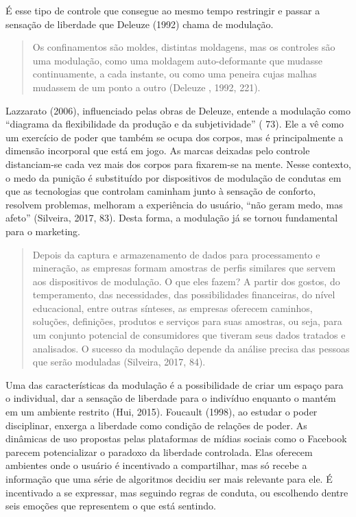 É esse tipo de controle que consegue ao mesmo tempo restringir e passar
a sensação de liberdade que Deleuze (1992) chama de modulação.

\begin{quote}
Os confinamentos são moldes, distintas moldagens, mas os controles são
uma modulação, como uma moldagem auto-deformante que mudasse
continuamente, a cada instante, ou como uma peneira cujas malhas
mudassem de um ponto a outro (Deleuze , 1992, 221).
\end{quote}

Lazzarato (2006), influenciado pelas obras de Deleuze, entende a
modulação como ``diagrama da flexibilidade da produção e da
subjetividade'' ( 73). Ele a vê como um exercício de poder que também se
ocupa dos corpos, mas é principalmente a dimensão incorporal que está em
jogo. As marcas deixadas pelo controle distanciam-se cada vez mais dos
corpos para fixarem-se na mente. Nesse contexto, o medo da punição é
substituído por dispositivos de modulação de condutas em que as
tecnologias que controlam caminham junto à sensação de conforto,
resolvem problemas, melhoram a experiência do usuário, ``não geram medo,
mas afeto'' (Silveira, 2017, 83). Desta forma, a modulação já se tornou
fundamental para o marketing.

\begin{quote}
Depois da captura e armazenamento de dados para processamento e
mineração, as empresas formam amostras de perfis similares que servem
aos dispositivos de modulação. O que eles fazem? A partir dos gostos, do
temperamento, das necessidades, das possibilidades financeiras, do nível
educacional, entre outras sínteses, as empresas oferecem caminhos,
soluções, definições, produtos e serviços para suas amostras, ou seja,
para um conjunto potencial de consumidores que tiveram seus dados
tratados e analisados. O sucesso da modulação depende da análise precisa
das pessoas que serão moduladas (Silveira, 2017, 84).
\end{quote}

Uma das características da modulação é a possibilidade de criar um
espaço para o individual, dar a sensação de liberdade para o indivíduo
enquanto o mantém em um ambiente restrito
\protect\hypertarget{__Fieldmark__1519_1356454502}{}{}(Hui, 2015).
Foucault (1998)\protect\hypertarget{__Fieldmark__1537_1356454502}{}{},
ao estudar o poder disciplinar, enxerga a liberdade como condição de
relações de poder. As dinâmicas de uso propostas pelas plataformas de
mídias sociais como o Facebook parecem potencializar o paradoxo da
liberdade controlada. Elas oferecem ambientes onde o usuário é
incentivado a compartilhar, mas só recebe a informação que uma série de
algoritmos decidiu ser mais relevante para ele. É incentivado a se
expressar, mas seguindo regras de conduta, ou escolhendo dentre seis
emoções que representem o que está sentindo.


